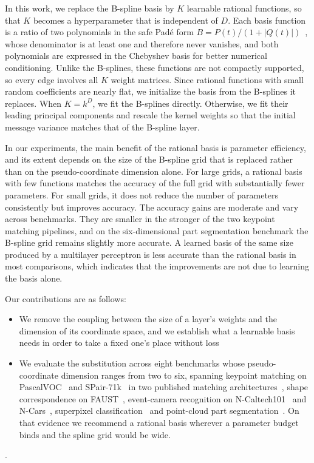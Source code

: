 \documentclass{article} %
\begin{document}
In this work, we replace the B-spline basis by $K$ learnable rational
functions, so that $K$ becomes a hyperparameter that is independent of $D$.
Each basis function is a ratio of two polynomials in the safe Pad\'e form
$B = P(t)/(1 + |Q(t)|)$~\citep{molina2020pade}, whose denominator is at least
one and therefore never vanishes, and both polynomials are expressed in the
Chebyshev basis for better numerical conditioning. Unlike the B-splines, these
functions are not compactly supported, so every edge involves all $K$ weight
matrices. Since rational functions with small random coefficients are nearly
flat, we initialize the basis from the B-splines it replaces. When $K = k^D$,
we fit the B-splines directly. Otherwise, we fit their leading principal
components and rescale the kernel weights so that the initial message variance
matches that of the B-spline layer.

In our experiments, the main benefit of the rational basis is parameter
efficiency, and its extent depends on the size of the B-spline grid that is
replaced rather than on the pseudo-coordinate dimension alone. For large grids,
a rational basis with few functions matches the accuracy of
the full grid with substantially fewer parameters. For small grids, it does not
reduce the number of parameters consistently but improves accuracy. The
accuracy gains are moderate and vary across benchmarks. They are smaller in the
stronger of the two keypoint matching pipelines, and on the six-dimensional
part segmentation benchmark the B-spline grid remains slightly more accurate. A
learned basis of the same size produced by a multilayer perceptron is less
accurate than the rational basis in most comparisons, which indicates that the
improvements are not due to learning the basis alone.

Our contributions are as follows:

\begin{itemize}
    \item We remove the coupling between the size of a
layer's weights and the dimension of its coordinate space, and we
establish what a learnable basis needs in order to take a fixed one's place
without loss
\item  We evaluate the substitution across eight benchmarks whose
pseudo-coordinate dimension ranges from two to six, spanning keypoint matching
on PascalVOC~\citep{everingham2010pascal} and SPair-71k~\citep{min2019spair}
in two published matching architectures~\citep{fey2020dgmc,normmatchtrans},
shape correspondence on FAUST~\citep{bogo2014faust}, event-camera recognition
on N-Caltech101~\citep{orchard2015converting} and N-Cars~\citep{sironi2018hats},
superpixel classification~\citep{dwivedi2023benchmarking} and point-cloud part
segmentation~\citep{yi2016scalable}. On that evidence we recommend a rational
basis wherever a parameter budget binds and the spline grid would be wide.
\end{itemize}.
\end{document}
